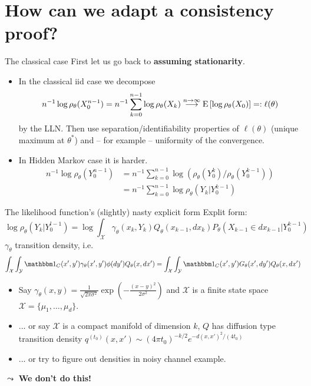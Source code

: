 \section{How can we adapt a consistency proof?}
\begin{frame}{The classical case}
First let us go back to \textbf{assuming stationarity}.
\begin{itemize}
	\item In the classical iid case we decompose \[n^{-1} \log \rho_\theta(X_0^{n-1}) = n^{-1}\sum_{k=0}^{n-1} \log \rho_\theta(X_k) \overset{n \to \infty}{\longrightarrow} \E[\log \rho_\theta(X_0)] =: \ell(\theta) \] by the LLN. Then use separation/identifiability properties of $\ell(\theta)$ (unique maximum at $\theta^\ast$) and -- for example -- uniformity of the convergence.
	\pause
	\item In Hidden Markov case it is harder. \begin{align*}
	n^{-1} \log \rho_\theta(Y_0^{n-1}) &= n^{-1} \sum_{k=0}^{n-1} \log \left(\rho_\theta(Y_0^{k})/ \rho_\theta(Y_0^{k-1})\right) \\ &= n^{-1} \sum_{k=0}^{n-1} \log \rho_{\theta}(Y_k|Y_0^{k-1})
	\end{align*}
\end{itemize}
\end{frame}

\begin{frame}{The likelihood function's (slightly) nasty explicit form}
	Explit form:
	\[\log \rho_\theta(Y_k | Y_{0}^{l-1}) = \log \int_\mathcal{X} \gamma_{\theta}(x_k,Y_{k}) Q_{\theta}(x_{k-1}, dx_k) P_{\theta}(X_{k-1} \in dx_{k-1} | Y_{0}^{k-1}) \]
	$\gamma_\theta$ transition density, i.e. \small\[
	\int_{\mathcal{X}} \int_\mathcal{Y} \indicator{C}(x',y') \gamma_\theta(x',y') \phi(dy') Q_{\theta}(x,dx') = \int_{\mathcal{X}} \int_\mathcal{Y} \indicator{C}(x',y') G_\theta(x',dy') Q_{\theta}(x,dx') \]\normalsize \pause
	\begin{itemize}
	\item Say $\gamma_\theta(x,y) = \frac{1}{\sqrt{2\pi \sigma^2}} \exp(-\frac{(x-y)^2}{2\sigma^2})$ and $\mathcal{X}$ is a finite state space $\mathcal{X} = \{\mu_1, \ldots, \mu_d\}$.  
	\item ... or say $\mathcal{X}$ is a compact manifold of dimension $k$, $Q$ has diffusion type transition density $q^{(t_0)}(x,x') \sim (4\pi t_0)^{-k/2}e^{-d(x,x')^2/(4t_0)}$
	\item ... or try to figure out densities in noisy channel example.
	\end{itemize}
	\pause $\leadsto$ \textbf{We don't do this!}
\end{frame}


